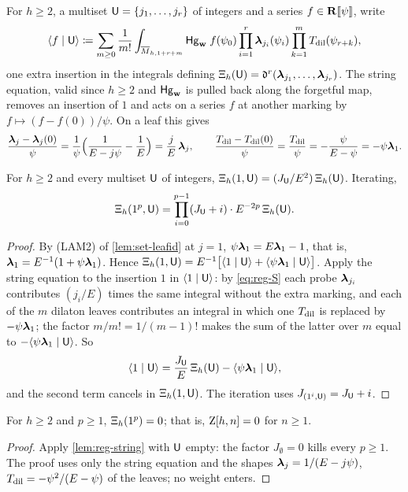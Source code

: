 For $h\geq 2$, a multiset $\mathsf{U}=\{j_1,\dots,j_r\}$ of integers and a series $f\in\mathbf{R}[\![ \psi ]\!]$, write
\[
\langle f\mid \mathsf{U}\rangle\coloneqq\sum_{m\geq 0}\frac{1}{m!}\int_{\overline{M}_{h,1+r+m}}\mathsf{Hg}_{\mathbf{w}}\;f(\psi_0)\prod_{i=1}^{r}\boldsymbol{\lambda}_{j_i}(\psi_i)\prod_{k=1}^{m}T_{\mathrm{dil}}(\psi_{r+k}),
\]
one extra insertion in the integrals defining $\Xi_h(\mathsf{U})=\mathfrak{d}^r(\boldsymbol{\lambda}_{j_1},\dots,\boldsymbol{\lambda}_{j_r})$. The string equation, valid since $h\geq 2$ and $\mathsf{Hg}_{\mathbf{w}}$ is pulled back along the forgetful map, removes an insertion of $1$ and acts on a series $f$ at another marking by $f\mapsto(f-f(0))/\psi$. On a leaf this gives
\begin{equation}
\label{eq:reg-S}
\frac{\boldsymbol{\lambda}_j-\boldsymbol{\lambda}_j(0)}{\psi}=\frac{1}{\psi}\Big(\frac{1}{E-j\psi}-\frac1E\Big)=\frac{j}{E}\,\boldsymbol{\lambda}_j,
\qquad
\frac{T_{\mathrm{dil}}-T_{\mathrm{dil}}(0)}{\psi}=\frac{T_{\mathrm{dil}}}{\psi}=-\frac{\psi}{E-\psi}=-\psi\boldsymbol{\lambda}_1 .
\end{equation}

\begin{lem}
\label{lem:reg-string}
For $h\geq 2$ and every multiset $\mathsf{U}$ of integers, $\Xi_h(1,\mathsf{U})=(J_{\mathsf{U}}/E^2)\,\Xi_h(\mathsf{U})$. Iterating,
\[
\Xi_h(1^p,\mathsf{U})=\prod_{i=0}^{p-1}(J_{\mathsf{U}}+i)\cdot E^{-2p}\,\Xi_h(\mathsf{U}).
\]
\end{lem}

\begin{proof}
By (LAM2) of \cref{lem:set-leafid} at $j=1$, $\psi\boldsymbol{\lambda}_1=E\boldsymbol{\lambda}_1-1$, that is, $\boldsymbol{\lambda}_1=E^{-1}(1+\psi\boldsymbol{\lambda}_1)$. Hence $\Xi_h(1,\mathsf{U})=E^{-1}\big[\langle 1\mid \mathsf{U}\rangle+\langle \psi\boldsymbol{\lambda}_1\mid \mathsf{U}\rangle\big]$. Apply the string equation to the insertion $1$ in $\langle 1\mid \mathsf{U}\rangle$: by \eqref{eq:reg-S} each probe $\boldsymbol{\lambda}_{j_i}$ contributes $(j_i/E)$ times the same integral without the extra marking, and each of the $m$ dilaton leaves contributes an integral in which one $T_{\mathrm{dil}}$ is replaced by $-\psi\boldsymbol{\lambda}_1$; the factor $m/m!=1/(m-1)!$ makes the sum of the latter over $m$ equal to $-\langle \psi\boldsymbol{\lambda}_1\mid \mathsf{U}\rangle$. So
\[
\langle 1\mid \mathsf{U}\rangle=\frac{J_{\mathsf{U}}}{E}\,\Xi_h(\mathsf{U})-\langle \psi\boldsymbol{\lambda}_1\mid \mathsf{U}\rangle,
\]
and the second term cancels in $\Xi_h(1,\mathsf{U})$. The iteration uses $J_{(1^i,\mathsf{U})}=J_{\mathsf{U}}+i$.
\end{proof}

\begin{lem}[Vanishing on $1^p$]
\label{lem:reg-C}
For $h\geq 2$ and $p\geq 1$, $\Xi_h(1^p)=0$; that is, $\mathrm{Z}[h,n]=0$ for $n\geq 1$.
\end{lem}

\begin{proof}
Apply \cref{lem:reg-string} with $\mathsf{U}$ empty: the factor $J_{\emptyset}=0$ kills every $p\geq 1$. The proof uses only the string equation and the shapes $\boldsymbol{\lambda}_j=1/(E-j\psi)$, $T_{\mathrm{dil}}=-\psi^2/(E-\psi)$ of the leaves; no weight enters.
\end{proof}

